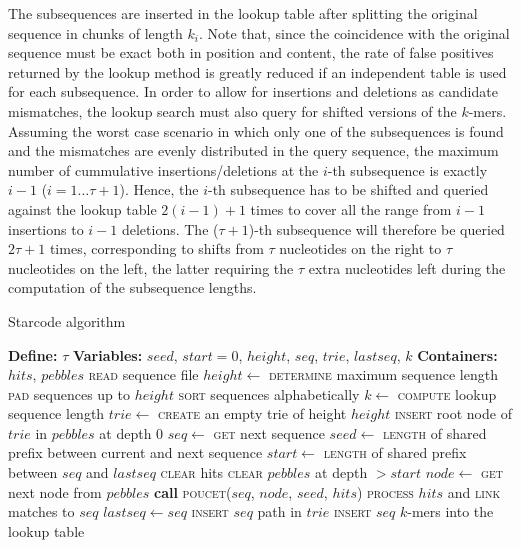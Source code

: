 \documentclass[10pt,onecolumn]{article}
\begin{document}
The subsequences are inserted in the lookup table after splitting
the original sequence in chunks of length $k_i$. Note that, since the
coincidence with the original sequence must be exact both in position
and content, the rate of false positives returned by the lookup method
is greatly reduced if an independent table is used for each
subsequence. In order to allow for insertions and deletions as candidate
mismatches, the lookup search must also query for shifted versions of
the $k$-mers. Assuming the worst case scenario in which only one of
the subsequences is found and the mismatches are evenly distributed in
the query sequence, the maximum number of cummulative
insertions/deletions at the $i$-th subsequence is exactly $i-1$ ($i =
1\ldots \tau+1$). Hence, the $i$-th subsequence has to be shifted and
queried against the lookup table $2(i-1)+1$ times to cover all the
range from $i-1$ insertions to $i-1$ deletions. The ($\tau+1$)-th
subsequence will therefore be queried $2\tau+1$ times, corresponding
to shifts from $\tau$ nucleotides on the right to $\tau$ nucleotides
on the left, the latter requiring the $\tau$ extra nucleotides left
during the computation of the subsequence lengths. 

\begin{algorithm}
  \caption{Starcode algorithm}
  \label{alg:starcode}
  \begin{algorithmic}[1]
    \State \textbf{Define:} $\tau$
    \State \textbf{Variables:} $seed$, $start = 0$,
    $height$, $seq$, $trie$, $lastseq$, $k$
    \State \textbf{Containers:} $hits$, $pebbles$
    \State \textsc{read} sequence file
    \State $height \gets$ \textsc{determine} maximum sequence length
    \State \textsc{pad} sequences up to $height$
    \State \textsc{sort} sequences alphabetically
    \State $k \gets$ \textsc{compute} lookup sequence length
    \State $trie \gets$ \textsc{create} an empty trie of height $height$
    \State \textsc{insert} root node of $trie$ in $pebbles$ at depth 0
    \State $seq \gets$ \textsc{get} next sequence
    \State $seed \gets$ \textsc{length} of shared prefix
    between current and next sequence
    \State $start \gets$ \textsc{length} of shared prefix
    between $seq$ and $lastseq$
    \State \textsc{clear} hits
    \State \textsc{clear} $pebbles$ at depth $>start$
    \State $node \gets$ \textsc{get} next node from $pebbles$
    \State \textbf{call} \textsc{poucet}($seq$, $node$, $seed$, $hits$)
    \EndFor
    \State \textsc{process} $hits$ and \textsc{link} matches to $seq$
    \State $lastseq \gets seq$
    \EndIf
    \State \textsc{insert} $seq$ path in $trie$
    \State \textsc{insert} $seq$ $k$-mers into the lookup table
    \EndFor
  \end{algorithmic}
\end{algorithm}
\end{document}
